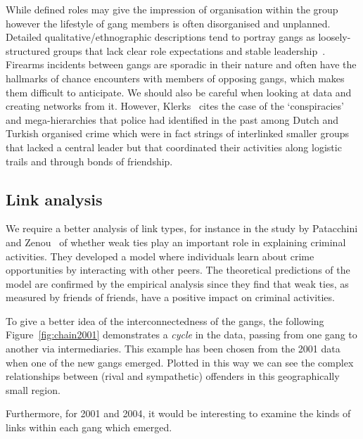 \documentclass[conference]{IEEEtran}
\theoremstyle{definition}
\begin{document}
While defined roles may give the impression of organisation within the
group however the lifestyle of gang members is often disorganised and
unplanned. Detailed qualitative/ethnographic descriptions tend to
portray gangs as loosely-structured groups that lack clear role
expectations and stable leadership~\cite{hughes:2005}. Firearms
incidents between gangs are sporadic in their nature and often have
the hallmarks of chance encounters with members of opposing gangs,
which makes them difficult to anticipate. We should also be careful
when looking at data and creating networks from it. However,
Klerks~\cite{Klerks2001} cites the case of the `conspiracies' and
mega-hierarchies that police had identified in the past among Dutch
and Turkish organised crime which were in fact strings of interlinked
smaller groups that lacked a central leader but that coordinated their
activities along logistic trails and through bonds of friendship.


\subsection{Link analysis}
We require a better analysis of link types, for instance in the study
by Patacchini and Zenou~\cite{PatacchiniZenou2008} of whether weak
ties play an important role in explaining criminal activities. They
developed a model where individuals learn about crime opportunities by
interacting with other peers. The theoretical predictions of the model
are confirmed by the empirical analysis since they find that weak
ties, as measured by friends of friends, have a positive impact on
criminal activities.

To give a better idea of the interconnectedness of the gangs, the
following Figure~\ref{fig:chain2001}  demonstrates a
\emph{cycle} in the data, passing from one gang to another via
intermediaries.  This example has been chosen from the 2001 data when one of the new gangs emerged. Plotted in this way we can see
the complex relationships between (rival and sympathetic) offenders in
this geographically small region.

Furthermore, for 2001 and 2004, it would be interesting to examine the
kinds of links within each gang which emerged.
\end{document}
